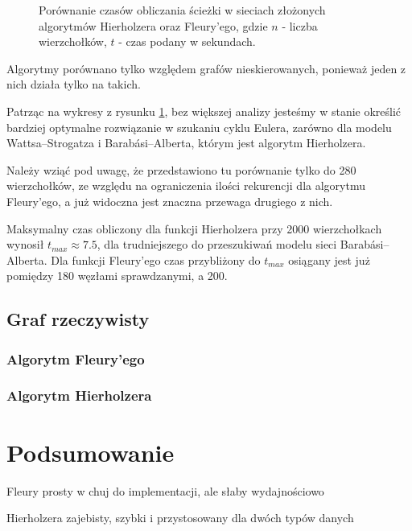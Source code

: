 \documentclass[a4paper, 12pt, twoside, openright]{article}
\begin{document}
\begin{figure}[!p]
	\caption[]{Porównanie czasów obliczania ścieżki w sieciach złożonych algorytmów Hierholzera oraz Fleury'ego, gdzie $n$ - liczba wierzchołków, $t$ - czas podany w sekundach.}
	\label{fh}
\end{figure}

\par\indent

	Algorytmy porównano tylko względem grafów nieskierowanych, ponieważ jeden z nich działa tylko na takich.
	
	Patrząc na wykresy z rysunku \ref{fh}, bez większej analizy jesteśmy w stanie określić bardziej optymalne rozwiązanie w szukaniu cyklu Eulera, zarówno dla modelu Wattsa–Strogatza i Barabási–Alberta, którym jest algorytm Hierholzera. 
	
	Należy wziąć pod uwagę, że przedstawiono tu porównanie tylko do 280 wierzchołków, ze względu na ograniczenia ilości rekurencji dla algorytmu Fleury'ego, a już widoczna jest znaczna przewaga drugiego z nich.
	
	Maksymalny czas obliczony dla funkcji Hierholzera przy 2000 wierzchołkach wynosił $t_{max} \approx 7.5$, dla trudniejszego do przeszukiwań modelu sieci Barabási–Alberta. Dla funkcji Fleury'ego czas przybliżony do $t_{max}$ osiągany jest już pomiędzy 180 węzłami sprawdzanymi, a 200.
	


\subsection{Graf rzeczywisty}
\subsubsection{Algorytm Fleury'ego}
\par\indent
\subsubsection{Algorytm Hierholzera}
\par\indent

\newpage
\section{Podsumowanie}
\indent\par
Fleury prosty w chuj do implementacji, ale słaby wydajnościowo

Hierholzera zajebisty, szybki i przystosowany dla dwóch typów danych
\end{document}
